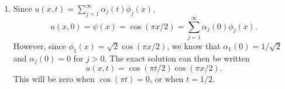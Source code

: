 {\begin{solution}
\begin{enumerate}
\item Since $u(x,t) = \sum_{j=1}^\infty \alpha_j(t)\phi_j(x)$, 
\[
u(x,0) = \psi(x) = \cos(\pi x/2) = \sum_{j=1}^\infty \alpha_j(0)\phi_j(x).
\]
However, since $\phi_1(x) = \sqrt{2}\cos(\pi x/2)$, we know that $\alpha_1(0) = 1/\sqrt{2}$ and $\alpha_j(0) = 0$ for $j > 0$.  The exact solution can then be written
\[
u(x,t) = \cos(\pi t/2)\cos(\pi x/2).
\]
This will be zero when $\cos(\pi t) = 0$, or when $t=1/2$.  
%
%
\end{enumerate}
 \end{solution}
}{}